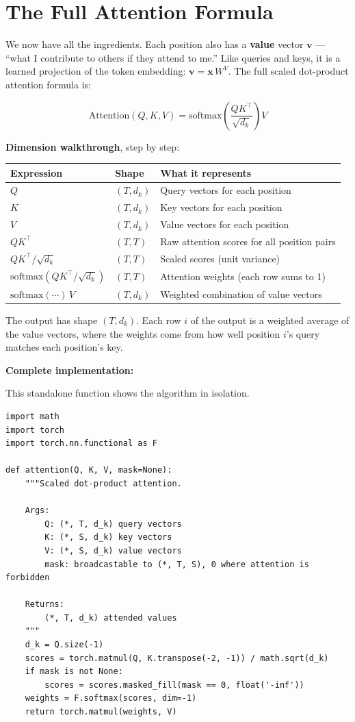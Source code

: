 \section{The Full Attention Formula}

We now have all the ingredients. Each position also has a \textbf{value} vector $\mathbf{v}$ --- ``what I contribute to others if they attend to me.'' Like queries and keys, it is a learned projection of the token embedding: $\mathbf{v} = \mathbf{x}\, W^V$. The full scaled dot-product attention formula is:

\[
\mathrm{Attention}(Q, K, V) = \mathrm{softmax}\!\left(\frac{QK^\top}{\sqrt{d_k}}\right) V
\]

\textbf{Dimension walkthrough}, step by step:

\begin{tabular}{lll}
\toprule
Expression & Shape & What it represents \\
\midrule
$Q$ & $(T, d_k)$ & Query vectors for each position \\
$K$ & $(T, d_k)$ & Key vectors for each position \\
$V$ & $(T, d_k)$ & Value vectors for each position \\
$QK^\top$ & $(T, T)$ & Raw attention scores for all position pairs \\
$QK^\top / \sqrt{d_k}$ & $(T, T)$ & Scaled scores (unit variance) \\
$\mathrm{softmax}(QK^\top / \sqrt{d_k})$ & $(T, T)$ & Attention weights (each row sums to 1) \\
$\mathrm{softmax}(\cdots)\, V$ & $(T, d_k)$ & Weighted combination of value vectors \\
\bottomrule
\end{tabular}

The output has shape $(T, d_k)$. Each row $i$ of the output is a weighted average of the value vectors, where the weights come from how well position $i$'s query matches each position's key.

\textbf{Complete implementation:}

This standalone function shows the algorithm in isolation.

\demotag
\begin{lstlisting}
import math
import torch
import torch.nn.functional as F

def attention(Q, K, V, mask=None):
    """Scaled dot-product attention.

    Args:
        Q: (*, T, d_k) query vectors
        K: (*, S, d_k) key vectors
        V: (*, S, d_k) value vectors
        mask: broadcastable to (*, T, S), 0 where attention is forbidden

    Returns:
        (*, T, d_k) attended values
    """
    d_k = Q.size(-1)
    scores = torch.matmul(Q, K.transpose(-2, -1)) / math.sqrt(d_k)
    if mask is not None:
        scores = scores.masked_fill(mask == 0, float('-inf'))
    weights = F.softmax(scores, dim=-1)
    return torch.matmul(weights, V)
\end{lstlisting}

